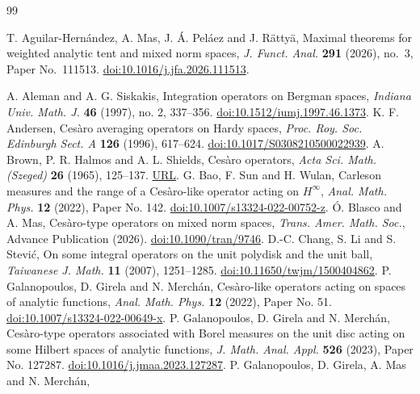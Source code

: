 \documentclass[preprint,12pt,times]{elsarticle}
\theoremstyle{definition}
\theoremstyle{remark}
\numberwithin{equation}{section}
\begin{document}
\begin{thebibliography}{99}

T. Aguilar-Hern\'andez, A. Mas, J. \'A. Pel\'aez and J. R\"atty\"a,
Maximal theorems for weighted analytic tent and mixed norm spaces,
\emph{J. Funct. Anal.} \textbf{291} (2026), no.\ 3,
Paper No.\ 111513. \href{https://doi.org/10.1016/j.jfa.2026.111513}{doi:10.1016/j.jfa.2026.111513}.

A. Aleman and A. G. Siskakis,
Integration operators on Bergman spaces,
\emph{Indiana Univ. Math. J.} \textbf{46} (1997), no. 2, 337--356. \href{https://doi.org/10.1512/iumj.1997.46.1373}{doi:10.1512/iumj.1997.46.1373}.
K. F. Andersen,
Ces\`aro averaging operators on Hardy spaces,
\emph{Proc. Roy. Soc. Edinburgh Sect. A} \textbf{126} (1996), 617--624. \href{https://doi.org/10.1017/S0308210500022939}{doi:10.1017/S0308210500022939}.
A. Brown, P. R. Halmos and A. L. Shields,
Ces\`aro operators,
\emph{Acta Sci. Math. (Szeged)} \textbf{26} (1965), 125--137. \href{https://acta.bibl.u-szeged.hu/14062/}{URL}.
G. Bao, F. Sun and H. Wulan,
Carleson measures and the range of a Ces\`aro-like operator acting on $H^\infty$,
\emph{Anal. Math. Phys.} \textbf{12} (2022), Paper No. 142. \href{https://doi.org/10.1007/s13324-022-00752-z}{doi:10.1007/s13324-022-00752-z}.
{\'O}. Blasco and A. Mas,
Ces{\`a}ro-type operators on mixed norm spaces,
\emph{Trans. Amer. Math. Soc.}, Advance Publication (2026). \href{https://doi.org/10.1090/tran/9746}{doi:10.1090/tran/9746}.
D.-C. Chang, S. Li and S. Stevi\'c,
On some integral operators on the unit polydisk and the unit ball,
\emph{Taiwanese J. Math.} \textbf{11} (2007), 1251--1285. \href{https://doi.org/10.11650/twjm/1500404862}{doi:10.11650/twjm/1500404862}.
P. Galanopoulos, D. Girela and N. Merch\'an,
Ces\`aro-like operators acting on spaces of analytic functions,
\emph{Anal. Math. Phys.} \textbf{12} (2022), Paper No. 51. \href{https://doi.org/10.1007/s13324-022-00649-x}{doi:10.1007/s13324-022-00649-x}.
P. Galanopoulos, D. Girela and N. Merch\'an,
Ces\`aro-type operators associated with Borel measures on the unit disc acting on some Hilbert spaces of analytic functions,
\emph{J. Math. Anal. Appl.} \textbf{526} (2023), Paper No. 127287. \href{https://doi.org/10.1016/j.jmaa.2023.127287}{doi:10.1016/j.jmaa.2023.127287}.
P. Galanopoulos, D. Girela, A. Mas and N. Merch\'an,

\end{thebibliography}
\end{document}
